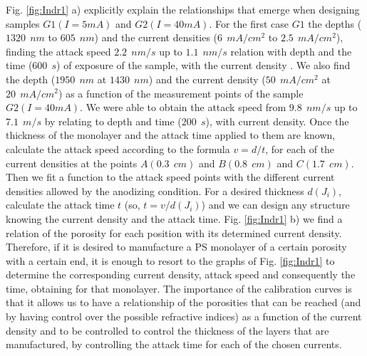 \documentclass{article}
\begin{document}
Fig. \ref{fig:Indr1} a) explicitly explain the relationships that
emerge when designing samples $ G1 (I = 5 mA) $ and $ G2 (I = 40 mA)
$. For the first case $ G1 $ the depths ($ 1320 \ \ nm $ to $ 605 \ \
nm $) and the current densities ($ 6 \ \ mA / cm ^ 2 $ to $ 2.5 \ \ mA
/ cm ^ 2 $), finding the attack speed $ 2.2 \ \ nm / s $ up to $ 1.1 \
\ nm / s $ relation with depth and the time ($ 600 \ \ s $) of
exposure of the sample, with the current density . We also find the
depth ($ 1950 \ \ nm $ at $ 1430 \ \ nm $) and the current density ($
50 \ \ mA / cm ^ 2 $ at $ 20 \ \ mA / cm ^ 2 $) as a function of the
measurement points of the sample $ G2 (I = 40 mA) $. We were able to
obtain the attack speed from $ 9.8 \ \ nm / s $ up to $ 7.1 \ \ m / s
$ by relating to depth and time ($ 200 \ \ s $), with current
density. Once the thickness of the monolayer and the attack time
applied to them are known, calculate the attack speed according to the
formula $ v = d / t $, for each of the current densities at the points
$ A ( 0.3 \ \ cm) $ and $ B (0.8 \ \ cm) $ and $ C (1.7 \ \ cm)
$. Then we fit a function to the attack speed points with the
different current densities allowed by the anodizing condition. For a
desired thickness $ d (J_i) $, calculate the attack time $ t $ (so, $
t = v / d (J_i) $) and we can design any structure knowing the current
density and the attack time. Fig. \ref{fig:Indr1} b) we find a
relation of the porosity for each position with its determined current
density. Therefore, if it is desired to manufacture a PS monolayer of
a certain porosity with a certain end, it is enough to resort to the
graphs of Fig. \ref{fig:Indr1} to determine the corresponding current
density, attack speed and consequently the time, obtaining for that
monolayer. The importance of the calibration curves is that it allows
us to have a relationship of the porosities that can be reached (and
by having control over the possible refractive indices) as a function
of the current density and to be controlled to control the thickness
of the layers that are manufactured, by controlling the attack time
for each of the chosen currents.
\end{document}
